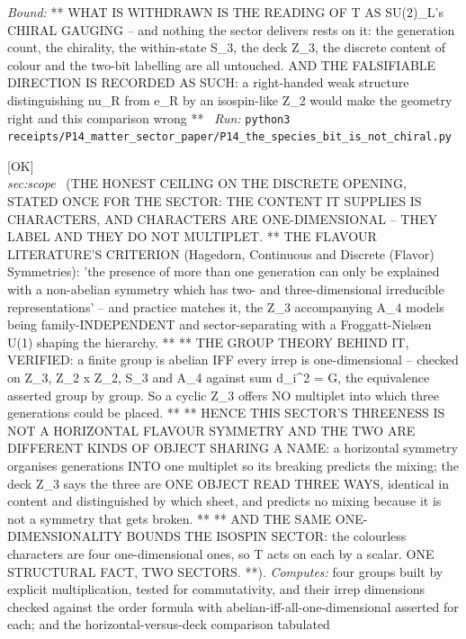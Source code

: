 \begin{description}
 \emph{Bound:} ** WHAT IS WITHDRAWN IS THE READING OF T AS SU(2)\_L's CHIRAL GAUGING -- and nothing the sector delivers rests on it: the generation count, the chirality, the within-state S\_3, the deck Z\_3, the discrete content of colour and the two-bit labelling are all untouched. AND THE FALSIFIABLE DIRECTION IS RECORDED AS SUCH: a right-handed weak structure distinguishing nu\_R from e\_R by an isospin-like Z\_2 would make the geometry right and this comparison wrong **
\ \emph{Run:} \texttt{python3 receipts/P14\_matter\_sector\_paper/P14\_the\_species\_bit\_is\_not\_chiral.py}
\item[\label{rcpt:P14_characters_label_they_do_not_multiplet}\texttt{P14\_characters\_label\_they\_do\_not\_multiplet}]\hfill\textsf{[OK]}\\
\textit{sec:scope} \ (THE HONEST CEILING ON THE DISCRETE OPENING, STATED ONCE FOR THE SECTOR: THE CONTENT IT SUPPLIES IS CHARACTERS, AND CHARACTERS ARE ONE-DIMENSIONAL -- THEY LABEL AND THEY DO NOT MULTIPLET. ** THE FLAVOUR LITERATURE'S CRITERION (Hagedorn, Continuous and Discrete (Flavor) Symmetries): 'the presence of more than one generation can only be explained with a non-abelian symmetry which has two- and three-dimensional irreducible representations' -- and practice matches it, the Z\_3 accompanying A\_4 models being family-INDEPENDENT and sector-separating with a Froggatt-Nielsen U(1) shaping the hierarchy. ** ** THE GROUP THEORY BEHIND IT, VERIFIED: a finite group is abelian IFF every irrep is one-dimensional -- checked on Z\_3, Z\_2 x Z\_2, S\_3 and A\_4 against sum d\_i\textasciicircum{}2 = \textbar{}G\textbar{}, the equivalence asserted group by group. So a cyclic Z\_3 offers NO multiplet into which three generations could be placed. ** ** HENCE THIS SECTOR'S THREENESS IS NOT A HORIZONTAL FLAVOUR SYMMETRY AND THE TWO ARE DIFFERENT KINDS OF OBJECT SHARING A NAME: a horizontal symmetry organises generations INTO one multiplet so its breaking predicts the mixing; the deck Z\_3 says the three are ONE OBJECT READ THREE WAYS, identical in content and distinguished by which sheet, and predicts no mixing because it is not a symmetry that gets broken. ** ** AND THE SAME ONE-DIMENSIONALITY BOUNDS THE ISOSPIN SECTOR: the colourless characters are four one-dimensional ones, so T acts on each by a scalar. ONE STRUCTURAL FACT, TWO SECTORS. **). 
\emph{Computes:} four groups built by explicit multiplication, tested for commutativity, and their irrep dimensions checked against the order formula with abelian-iff-all-one-dimensional asserted for each; and the horizontal-versus-deck comparison tabulated

\end{description}
